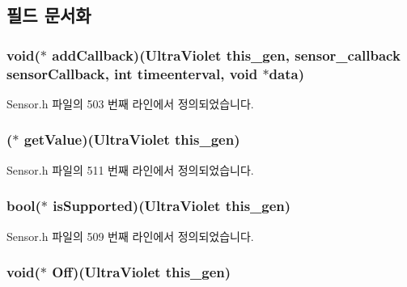 \subsection{필드 문서화}
\hypertarget{struct___ultra_violet_a90e8e8909dc65107be66027f73c2c888}{
\subsubsection[{add\-Callback}]{\setlength{\rightskip}{0pt plus 5cm}void($\ast$  add\-Callback)({\bf Ultra\-Violet} this\-\_\-gen, {\bf sensor\-\_\-callback} sensor\-Callback, int timeenterval, void $\ast$data)}}\label{struct___ultra_violet_a90e8e8909dc65107be66027f73c2c888}


Sensor.\-h 파일의 503 번째 라인에서 정의되었습니다.

\hypertarget{struct___ultra_violet_ad2f32aac4a27630b46e825c41eee7eb3}{
\subsubsection[{get\-Value}]{($\ast$  get\-Value)({\bf Ultra\-Violet} this\-\_\-gen)}}\label{struct___ultra_violet_ad2f32aac4a27630b46e825c41eee7eb3}


Sensor.\-h 파일의 511 번째 라인에서 정의되었습니다.

\hypertarget{struct___ultra_violet_a3c866c9d5dac5b54f8dabd80f2111c4c}{
\subsubsection[{is\-Supported}]{\setlength{\rightskip}{0pt plus 5cm}bool($\ast$  is\-Supported)({\bf Ultra\-Violet} this\-\_\-gen)}}\label{struct___ultra_violet_a3c866c9d5dac5b54f8dabd80f2111c4c}


Sensor.\-h 파일의 509 번째 라인에서 정의되었습니다.

\hypertarget{struct___ultra_violet_a4eaa529090e12bd7eb2a2c568f0c0539}{
\subsubsection[{Off}]{\setlength{\rightskip}{0pt plus 5cm}void($\ast$  Off)({\bf Ultra\-Violet} this\-\_\-gen)}}\label{struct___ultra_violet_a4eaa529090e12bd7eb2a2c568f0c0539}


